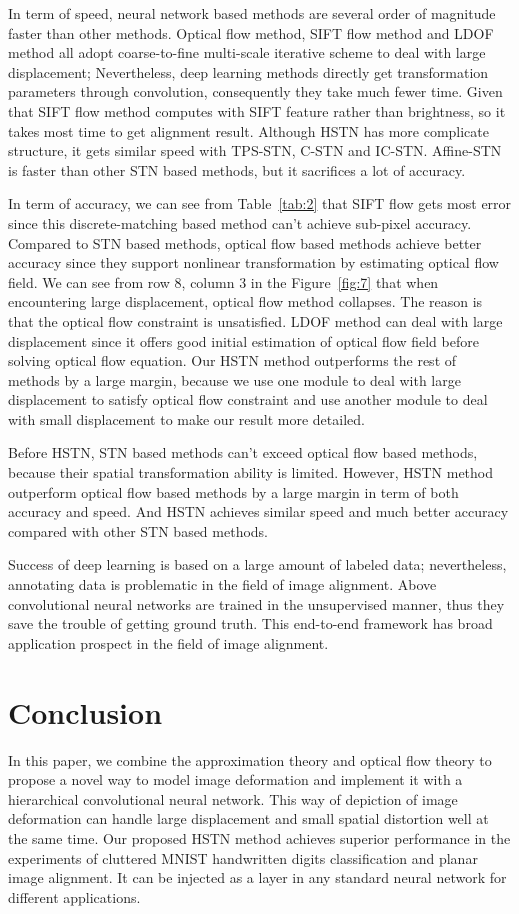 \documentclass{article}
\begin{document}
In term of speed, neural network based methods are several order of magnitude faster than other methods.
Optical flow method, SIFT flow method and LDOF method all adopt coarse-to-fine multi-scale iterative scheme to deal with large displacement; Nevertheless, deep learning methods directly get transformation parameters through convolution, consequently they take much fewer time.
Given that SIFT flow method computes with SIFT feature rather than brightness, so it takes most time to get alignment result.
Although HSTN has more complicate structure, it gets similar speed with TPS-STN, C-STN and IC-STN.
Affine-STN is faster than other STN based methods, but it sacrifices a lot of accuracy.

In term of accuracy, we can see from Table~\ref{tab:2} that SIFT flow gets most error since this discrete-matching based method can't achieve sub-pixel accuracy.
Compared to STN based methods, optical flow based methods achieve better accuracy since they support nonlinear transformation by estimating optical flow field.
We can see from row 8, column 3 in the Figure~\ref{fig:7} that when encountering large displacement, optical flow method collapses.
The reason is that the optical flow constraint is unsatisfied.
LDOF method can deal with large displacement since it offers good initial estimation of optical flow field before solving optical flow equation.
Our HSTN method outperforms the rest of methods by a large margin, because we use one module to deal with large displacement to satisfy optical flow constraint and use another module to deal with small displacement to make our result more detailed.

Before HSTN, STN based methods can't exceed optical flow based methods, because their spatial transformation ability is limited.
However, HSTN method outperform optical flow based methods by a large margin in term of both accuracy and speed.
And HSTN achieves similar speed and much better accuracy compared with other STN based methods.

Success of deep learning is based on a large amount of labeled data; nevertheless, annotating data is problematic in the field of image alignment.
Above convolutional neural networks are trained in the unsupervised manner, thus they save the trouble of getting ground truth.
This end-to-end framework has broad application prospect in the field of image alignment.
\section{Conclusion}
In this paper, we combine the approximation theory and optical flow theory to propose a novel way to model image deformation and implement it with a hierarchical convolutional neural network.
This way of depiction of image deformation can handle large displacement and small spatial distortion well at the same time.
Our proposed HSTN method achieves superior performance in the experiments of cluttered MNIST handwritten digits classification and planar image alignment.
It can be injected as a layer in any standard neural network for different applications.
\end{document}
